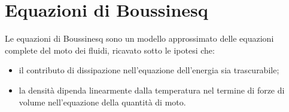 \documentclass[letterpaper,10pt,italian]{jupyterBook}
\begin{document}
\section{Equazioni di Boussinesq}
\label{\detokenize{polimi/fluidmechanics-ita/template/capitoli/07_similitudine/07teoria:equazioni-di-boussinesq}}
\sphinxAtStartPar
Le equazioni di Boussinesq sono un modello approssimato delle equazioni
complete del moto dei fluidi, ricavato sotto le ipotesi che:
\begin{itemize}
\item {} 
\sphinxAtStartPar
il contributo di dissipazione nell’equazione dell’energia sia
trascurabile;

\item {} 
\sphinxAtStartPar
la densità dipenda linearmente dalla temperatura nel termine di
forze di volume nell’equazione della quantità di moto.

\end{itemize}
\end{document}
